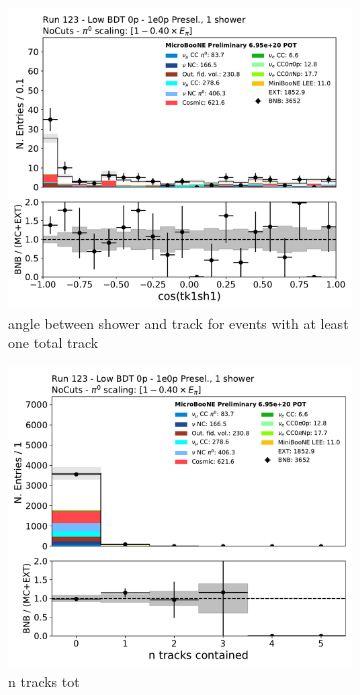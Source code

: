 \begin{figure}[H]
    \centering
    \begin{subfigure}{0.3\textwidth}
    \includegraphics[width=1.0\textwidth]{1e0p/Low_BDT_Sideband/tk1sh1_angle_alltk.pdf}
    \caption{angle between shower and track for events with at least one total track}
    \end{subfigure}
    \begin{subfigure}{0.3\textwidth}
    \includegraphics[width=1.0\textwidth]{1e0p/Low_BDT_Sideband/n_tracks_tot.pdf}
    \caption{n tracks tot}
    \end{subfigure}
    \caption{} 
    \label{fig:1e0p:Low_BDT_Sideband:datamc2}
\end{figure}


